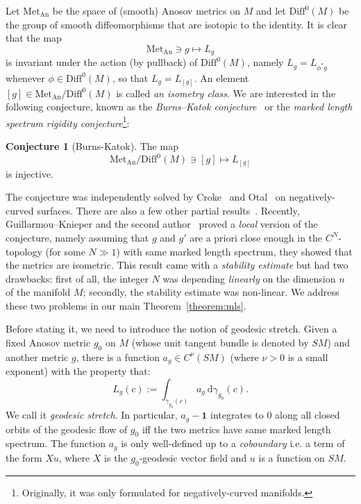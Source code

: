 \documentclass[10pt]{amsart}
\theoremstyle{definition}\newtheorem{defi}[theo]{Definition}\newtheorem{rema}[theo]{Remark}\newtheorem{exam}[theo]{Example}\newtheorem{exem}[theo]{Example}\newtheorem{nota}[theo]{Notation}
\newcommand{\bfun}{\mathbf{1}}
\newcommand{\dd}{\mathrm{d}}
\newcommand{\Met}{\mathrm{Met}}
\newcommand{\An}{\mathrm{An}}
\newcommand{\Diff}{\mathrm{Diff}}
\newtheorem{conjecture}[theo]{Conjecture}
\begin{document}
Let $\Met_{\An}$ be the space of (smooth) Anosov metrics on $M$ and let $\Diff^0(M)$ be the group of smooth diffeomorphisms that are isotopic to the identity. It is clear that the map
\[
\Met_{\An} \ni g \mapsto L_{g}
\]
is invariant under the action (by pullback) of $\Diff^0(M)$, namely $L_g = L_{\phi^*g}$ whenever $\phi \in \Diff^0(M)$, so that $L_g = L_{[g]}$. An element $[g] \in \Met_{\An}/\Diff^0(M)$ is called \emph{an isometry class}. We are interested in the following conjecture, known as the \emph{Burns--Katok conjecture}~\cite{Burns-Katok-85} or the \emph{marked length spectrum rigidity conjecture}\footnote{Originally, it was only formulated for negatively-curved manifolds.}:

\begin{conjecture}[Burns-Katok]
The map
\[
\Met_{\An}/\Diff^0(M) \ni [g] \mapsto L_{[g]}
\]
is injective.
\end{conjecture}


The conjecture was independently solved by Croke~\cite{Croke-90} and Otal~\cite{Otal-90} on negatively-curved surfaces. There are also a few other partial results~\cite{Besson-Courtois-Gallot-95,Hamenstadt-99,Katok-88}. Recently, Guillarmou--Knieper and the second author~\cite{Guillarmou-Knieper-Lefeuvre-19,Guillarmou-Lefeuvre-18} proved a \emph{local} version of the conjecture, namely assuming that $g$ and $g'$ are a priori close enough in the $C^N$-topology (for some $N \gg 1$) with same marked length spectrum, they showed that the metrics are isometric. This result came with a \emph{stability estimate} but had two drawbacks: first of all, the integer $N$ was depending \emph{linearly} on the dimension $n$ of the manifold $M$; secondly, the stability estimate was non-linear. We address these two problems in our main Theorem~\ref{theorem:mls}.

Before stating it, we need to introduce the notion of geodesic stretch. Given a fixed Anosov metric $g_0$ on $M$ (whose unit tangent bundle is denoted by $SM$) and another metric $g$, there is a function $a_g \in C^\nu(SM)$ (where $\nu > 0$ is a small exponent) with the property that:
\[
L_g(c) := \int_{\gamma_{g_0}(c)} a_g~\dd \gamma_{g_0}(c).
\]
We call it \emph{geodesic stretch}. In particular, $a_g-\bfun$ integrates to $0$ along all closed orbits of the geodesic flow of $g_0$ iff the two metrics have same marked length spectrum. The function $a_g$ is only well-defined up to a \emph{coboundary} i.e. a term of the form $X u$, where $X$ is the $g_0$-geodesic vector field and $u$ is a function on $SM$.
\end{document}
